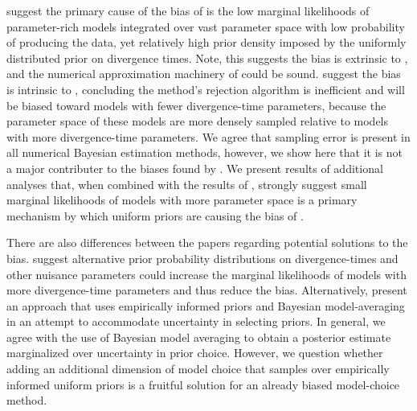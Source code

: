 \documentclass[letterpaper,12pt]{article}
\begin{document}
\begin{linenumbers}
\citet{Oaks2012} suggest the primary cause of the bias of \msb is the low
marginal likelihoods of parameter-rich models integrated over vast parameter
space with low probability of producing the data, yet relatively high prior
density \citep{Lindley1957} imposed by the uniformly distributed prior on
divergence times.
Note, this suggests the bias is extrinsic to \msb, and the numerical
approximation machinery of \msb could be sound.
\citet{Hickerson2013} suggest the bias is intrinsic to \msb, concluding the
method's rejection algorithm is inefficient and will be biased
toward models with fewer divergence-time parameters, because the parameter
space of these models are more densely sampled relative to models with more
divergence-time parameters.
We agree that sampling error is present in all numerical Bayesian estimation
methods, however, we show here that it is not a major contributer to the
biases found by \citet{Oaks2012}.
We present results of additional analyses that, when combined with
the results of \citet{Oaks2012}, strongly suggest small marginal likelihoods of
models with more parameter space is a primary mechanism by which uniform priors
are causing the bias of \msb.


There are also differences between the papers regarding potential solutions to
the bias.
\citet{Oaks2012} suggest alternative prior probability distributions on
divergence-times and other nuisance parameters could increase the marginal
likelihoods of models with more divergence-time parameters and thus reduce the
bias.
Alternatively, \citet{Hickerson2013} present an approach that uses empirically
informed priors and Bayesian model-averaging in an attempt to accommodate
uncertainty in selecting priors.
In general, we agree with the use of Bayesian model averaging to obtain a
posterior estimate marginalized over uncertainty in prior choice.
However, we question whether adding an additional dimension of model choice
that samples over empirically informed uniform priors is a fruitful solution
for an already biased model-choice method.


\end{linenumbers}
\end{document}
